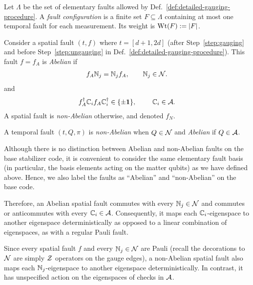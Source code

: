 \documentclass[11pt]{article}
\begin{document}
\begin{definition}
    Let $\Lambda$ be the set of elementary faults allowed by Def.~\ref{def:detailed-gauging-procedure}.
    A \emph{fault configuration} is a finite set $F\subseteq \Lambda$ containing at most one temporal fault for each measurement. Its weight is $\operatorname{Wt}(F) := |F|$.
\end{definition}

\begin{definition}
\label{def:abelian-non-abelian-faults}
    Consider a spatial fault $(t,f)$ where $t=[d+1,2d]$ (after Step~\ref{step:gauging} and before Step~\ref{step:ungauging} in Def.~\ref{def:detailed-gauging-procedure}). 
    This fault $f = f_A$ is \emph{Abelian} if 
    \begin{align}
        f_A\mathbb{N}_{j}=\mathbb{N}_{j}f_A,\qquad \mathbb{N}_{j}\in \mathcal{N}.\label{eq:Fa-commutes-nS}
    \end{align}
    and 
    \begin{align}
        f^\dagger_A \aS{i} f_A \aS{i}^\dagger \in \{\pm \id \},\qquad\ \aS{i}\in \cA.
        \label{eq:abelian-condition-2}
    \end{align}
    A spatial fault is \emph{non-Abelian} otherwise, and denoted $f_N$.
    
    A temporal fault $(t, Q, \pi)$ is \emph{non-Abelian} when $Q\in \mathcal{N}$ and \emph{Abelian} if $Q\in \mathcal{A}$.
\end{definition}

\begin{remark}
    Although there is no distinction between Abelian and non-Abelian faults on the base stabilizer code, it is convenient to consider the same elementary fault basis (in particular, the basis elements acting on the matter qubits) as we have defined above. Hence, we also label the faults as ``Abelian'' and ``non-Abelian'' on the base code. 
\end{remark}

Therefore, an Abelian spatial fault commutes with every $\mathbb{N}_{j}\in\mathcal{N}$ and commutes or anticommutes with every $\mathbb{C}_{i}\in \mathcal{A}$.
Consequently, it maps each $\mathbb{C}_{i}$-eigenspace to another eigenspace deterministically as opposed to a linear combination of eigenspaces, as with a regular Pauli fault.

Since every spatial fault $f$ and every $\mathbb{N}_{j}\in \mathcal{N}$ are Pauli (recall the decorations to $\mathcal{N}$ are simply $\mathcal{Z}$ operators on the gauge edges), a non-Abelian spatial fault also maps each $\mathbb{N}_{j}$-eigenspace to another eigenspace deterministically. In contrast, it has unspecified action on the eigenspaces of checks in $\mathcal{A}$.
\end{document}
